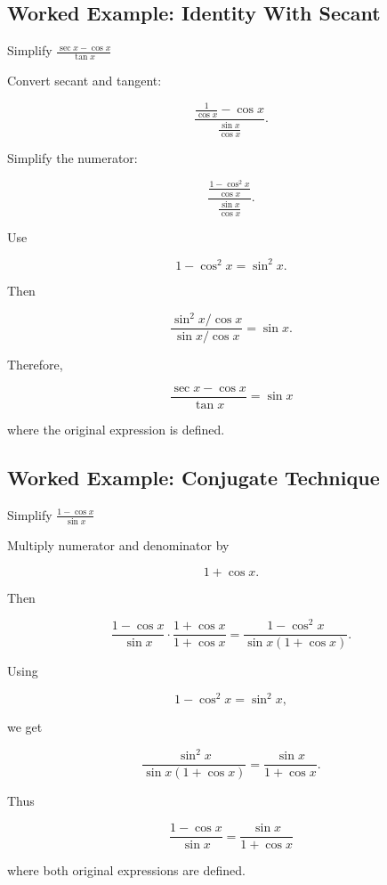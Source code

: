 \subsection{Worked Example: Identity With Secant}
\label{subsec:worked-verify-secant}

\begin{workedexamplebox}{Simplify \(\frac{\sec x-\cos x}{\tan x}\)}

Convert secant and tangent:

\[
\frac{
\frac1{\cos x}-\cos x
}{
\frac{\sin x}{\cos x}
}.
\]

Simplify the numerator:

\[
\frac{
\frac{
1-\cos^2x
}{
\cos x
}
}{
\frac{\sin x}{\cos x}
}.
\]

Use

\[
1-\cos^2x
=
\sin^2x.
\]

Then

\[
\frac{
\sin^2x/\cos x
}{
\sin x/\cos x
}
=
\sin x.
\]

Therefore,

\begin{answerbox}
\[
\boxed{
\frac{\sec x-\cos x}{\tan x}
=
\sin x
}
\]

where the original expression is defined.
\end{answerbox}

\end{workedexamplebox}

\subsection{Worked Example: Conjugate Technique}
\label{subsec:worked-trig-conjugate-technique}

\begin{workedexamplebox}{Simplify \(\frac{1-\cos x}{\sin x}\)}

Multiply numerator and denominator by

\[
1+\cos x.
\]

Then

\[
\frac{1-\cos x}{\sin x}
\cdot
\frac{1+\cos x}{1+\cos x}
=
\frac{
1-\cos^2x
}{
\sin x(1+\cos x)
}.
\]

Using

\[
1-\cos^2x
=
\sin^2x,
\]

we get

\[
\frac{
\sin^2x
}{
\sin x(1+\cos x)
}
=
\frac{
\sin x
}{
1+\cos x
}.
\]

Thus

\begin{answerbox}
\[
\boxed{
\frac{1-\cos x}{\sin x}
=
\frac{\sin x}{1+\cos x}
}
\]

where both original expressions are defined.
\end{answerbox}

\end{workedexamplebox}

